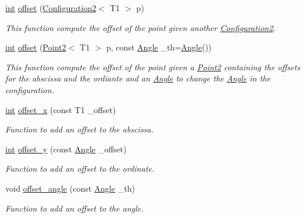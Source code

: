 \begin{DoxyCompactItemize}
\mbox{\hyperlink{draw_8hh_aa620a13339ac3a1177c86edc549fda9b}{int}} \mbox{\hyperlink{class_configuration2_abc07742a00822719024a8a58d003a6f1}{offset}} (\mbox{\hyperlink{class_configuration2}{Configuration2}}$<$ T1 $>$ p)
\begin{DoxyCompactList}\small\item\em This function compute the offset of the point given another {\ttfamily \mbox{\hyperlink{class_configuration2}{Configuration2}}}. \end{DoxyCompactList}\item 
\mbox{\hyperlink{draw_8hh_aa620a13339ac3a1177c86edc549fda9b}{int}} \mbox{\hyperlink{class_configuration2_ad2f7df498d8fd4c0e125a1f628fa22b7}{offset}} (\mbox{\hyperlink{class_point2}{Point2}}$<$ T1 $>$ p, const \mbox{\hyperlink{class_angle}{Angle}} \+\_\+th=\mbox{\hyperlink{class_angle}{Angle}}())
\begin{DoxyCompactList}\small\item\em This function compute the offset of the point given a {\ttfamily \mbox{\hyperlink{class_point2}{Point2}}} containing the offsets for the abscissa and the ordiante and an {\ttfamily \mbox{\hyperlink{class_angle}{Angle}}} to change the {\ttfamily \mbox{\hyperlink{class_angle}{Angle}}} in the configuration. \end{DoxyCompactList}\item 
\mbox{\hyperlink{draw_8hh_aa620a13339ac3a1177c86edc549fda9b}{int}} \mbox{\hyperlink{class_configuration2_a49f13949ff2fbeefdac31bc0f9e13dab}{offset\+\_\+x}} (const T1 \+\_\+offset)
\begin{DoxyCompactList}\small\item\em Function to add an offset to the abscissa. \end{DoxyCompactList}\item 
\mbox{\hyperlink{draw_8hh_aa620a13339ac3a1177c86edc549fda9b}{int}} \mbox{\hyperlink{class_configuration2_ae29330a14b06e1ecb22a6bee4e954f81}{offset\+\_\+y}} (const \mbox{\hyperlink{class_angle}{Angle}} \+\_\+offset)
\begin{DoxyCompactList}\small\item\em Function to add an offset to the ordinate. \end{DoxyCompactList}\item 
void \mbox{\hyperlink{class_configuration2_a561351ec15558fdceb9f65ff6296a6a7}{offset\+\_\+angle}} (const \mbox{\hyperlink{class_angle}{Angle}} \+\_\+th)
\begin{DoxyCompactList}\small\item\em Function to add an offset to the angle. \end{DoxyCompactList}\item 

\end{DoxyCompactItemize}
